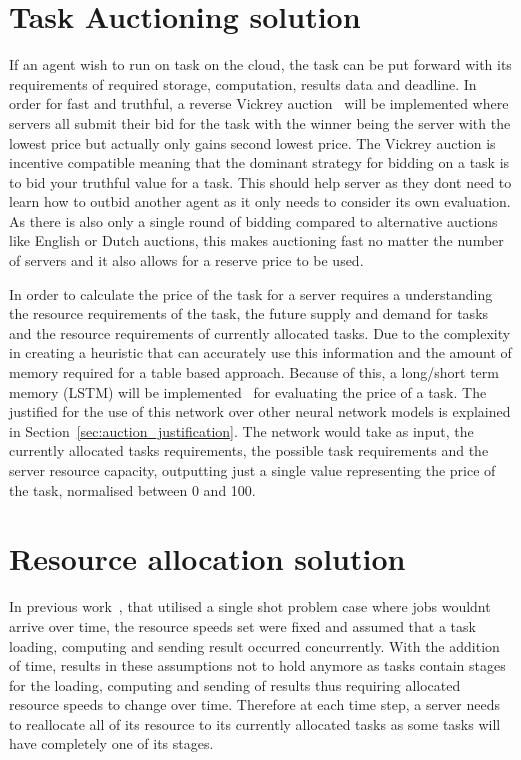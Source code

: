 \section{Task Auctioning solution}\label{sec:task-auctioning}
If an agent wish to run on task on the cloud, the task can be put forward with its requirements of required storage,
computation, results data and deadline. In order for fast and truthful, a reverse Vickrey auction~\citep{vickrey}
will be implemented  where servers all submit their bid for the task with the winner being the server with the lowest
price but actually only gains second lowest price. The Vickrey auction is incentive compatible meaning that the dominant
strategy for bidding on a task is to bid your truthful value for a task. This should help server as they dont need
to learn how to outbid another agent as it only needs to consider its own evaluation.
As there is also only a single round of bidding compared to alternative auctions like English or Dutch
auctions, this makes auctioning fast no matter the number of servers and it also allows for a reserve price to be used.

In order to calculate the price of the task for a server requires a understanding the resource requirements of the task,
the future supply and demand for tasks and the resource requirements of currently allocated tasks. Due to the complexity
in creating a heuristic that can accurately use this information and the amount of memory required for a table based
approach. Because of this, a long/short term memory (LSTM) will be implemented~\citep{LSTM}  for evaluating the price
of a task. The justified for the use of this network over other neural network models is explained in
Section~\ref{sec:auction_justification}. The network would take as input, the currently
allocated tasks requirements, the possible task requirements and the server resource capacity, outputting just a single
value representing the price of the task, normalised between 0 and 100.

\section{Resource allocation solution}\label{sec:resource-allocation-solution}
In previous work~\citep{FlexibleResourceAllocation}, that utilised a single shot problem case where jobs wouldnt arrive
over time, the resource speeds set were fixed and assumed that a task loading, computing and sending result
occurred concurrently. With the addition of time, results in these assumptions not to hold anymore as tasks contain
stages for the loading, computing and sending of results thus requiring allocated resource speeds to change over time.
Therefore at each time step, a server needs to reallocate all of its resource to its currently allocated tasks as
some tasks will have completely one of its stages.

